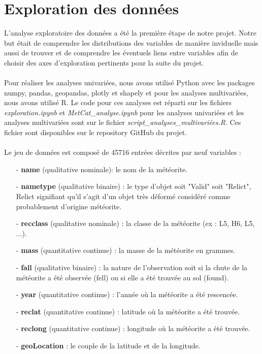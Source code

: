 \documentclass[12pt]{article}
\begin{document}
\section{Exploration des données}
{\setlength{\baselineskip}{1\baselineskip}
L'analyse exploratoire des données a été la première étape de notre projet. Notre but était de comprendre les distributions des variables de manière inviduelle mais aussi de trouver et de comprendre les éventuels liens entre variables afin de choisir des axes d'exploration pertinents pour la suite du projet.\\
\\
Pour réaliser les analyses univariées, nous avons utilisé Python avec les packages numpy, pandas, geopandas, plotly et shapely et pour les analyses multivariées, nous avons utilisé R. Le code pour ces analyses est réparti sur les fichiers \textit{exploration.ipynb} et \textit{MetCat\_analyse.ipynb} pour les analyses univariées et les analyses multivariées sont sur le fichier \textit{script\_analyses\_multivariées.R}. Ces fichier sont disponibles sur le repository GitHub du projet.\\
\\
Le jeu de données est composé de 45716 entrées décrites par neuf variables :\\
}
{\setlength{\baselineskip}{1.5\baselineskip}
\begin{itemize}
\item[-] \textbf{name} (qualitative nominale): le nom de la météorite.
\item[-] \textbf{nametype} (qualitative binaire) : le type d'objet soit "Valid" soit "Relict", Relict signifiant qu'il s'agit d'un objet très déformé considéré comme probablement d'origine météorite.
\item[-] \textbf{recclass} (qualitative nominale) : la classe de la météorite (ex : L5, H6, L5, ...).
\item[-] \textbf{mass} (quantitative continue) : la masse de la météorite en grammes.
\item[-] \textbf{fall} (qualitative binaire) : la nature de l'observation soit si la chute de la météorite a été observée (fell) ou si elle a été trouvée au sol (found).
\item[-] \textbf{year} (quantitative continue) : l'année où la météorite a été rescencée.
\item[-] \textbf{reclat} (quantitative continue) : latitude où la météorite a été trouvée.
\item[-] \textbf{reclong} (quantitative continue) : longitude où la météorite a été trouvée.
\item[-]\textbf{geoLocation} : le couple de la latitude et de la longitude.\\
\end{itemize}
}
\end{document}
